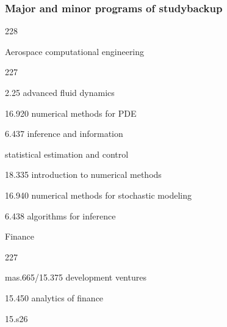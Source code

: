 \documentclass{beamer}
\newcommand{\barrow}{\item[\color{darkred}\ding{228}]}
\newcommand{\carrow}{\item[\color{darkred}\ding{227}]}
\begin{document}
\begin{frame}
    \frametitle{Major and minor programs of study\hfill \scriptsize{backup}}\small
    \begin{dinglist}{228}
        \barrow Aerospace computational engineering\scriptsize
                \begin{dinglist}{227}
                    \carrow 2.25 advanced fluid dynamics
                    \carrow 16.920 numerical methods for PDE
                    \carrow 6.437 inference and information
                    \carrow statistical estimation and control
                    \carrow 18.335 introduction to numerical methods
                    \carrow 16.940 numerical methods for stochastic modeling
                    \carrow 6.438 algorithms for inference
                \end{dinglist}
        \small
        \barrow Finance\scriptsize
                \begin{dinglist}{227}
                    \carrow mas.665/15.375 development ventures
                    \carrow 15.450 analytics of finance
                    \carrow 15.s26
                \end{dinglist}
    \end{dinglist}
\end{frame}
\end{document}
